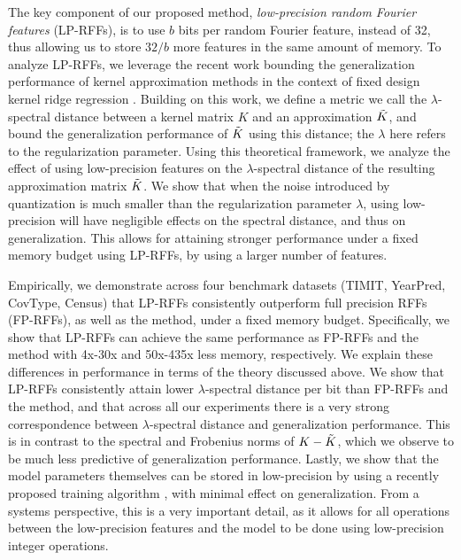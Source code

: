 
The key component of our proposed method, \textit{low-precision random Fourier features} (LP-RFFs), is to use $b$ bits per random Fourier feature, instead of 32, thus allowing us to store $32/b$ more features in the same amount of memory. To analyze LP-RFFs, we leverage the recent work bounding the generalization performance of kernel approximation methods in the context of fixed design kernel ridge regression \citep{avron17,musco17}. Building on this work, we define a metric we call the $\lambda$-spectral distance between a kernel matrix $K$ and an approximation $\tilde{K}$, and bound the generalization performance of $\tilde{K}$ using this distance; the $\lambda$ here refers to the regularization parameter. Using this theoretical framework, we analyze the effect of using low-precision features on the $\lambda$-spectral distance of the resulting approximation matrix $\tilde{K}$. We show that when the noise introduced by quantization is much smaller than the regularization parameter $\lambda$, using low-precision will have negligible effects on the spectral distance, and thus on generalization.  This allows for attaining stronger performance under a fixed memory budget using LP-RFFs, by using a larger number of features.

Empirically, we demonstrate across four benchmark datasets (TIMIT, YearPred, CovType, Census) that LP-RFFs consistently outperform full precision RFFs (FP-RFFs), as well as the \Nystrom method, under a fixed memory budget. Specifically, we show that LP-RFFs can achieve the same performance as FP-RFFs and the \Nystrom method with 4x-30x and 50x-435x less memory, respectively. We explain these differences in performance in terms of the theory discussed above. We show that LP-RFFs consistently attain lower $\lambda$-spectral distance per bit than FP-RFFs and the \Nystrom method, and that across all our experiments there is a very strong correspondence between $\lambda$-spectral distance and generalization performance. This is in contrast to the spectral and Frobenius norms of $K-\tilde{K}$, which we observe to be much less predictive of generalization performance.  Lastly, we show that the model parameters themselves can be stored in low-precision by using a recently proposed training algorithm \citep{halp18}, with minimal effect on generalization. From a systems perspective, this is a very important detail, as it allows for all operations between the low-precision features and the model to be done using low-precision integer operations.

